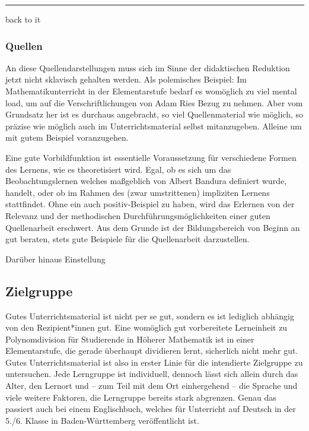 \vspace{12pt}
\hrule
\vspace{12pt}

back to it


\subsubsection{Quellen}

An diese Quellendarstellungen muss sich im Sinne der didaktischen Reduktion jetzt nicht sklavisch gehalten werden.
Als polemisches Beispiel: Im Mathematikunterricht in der Elementarstufe bedarf es womöglich zu viel mental load, um auf die Verschriftlichungen von Adam Ries Bezug zu nehmen. Aber vom Grundsatz her ist es durchaus angebracht, so viel Quellenmaterial wie möglich, so präzise wie möglich auch im Unterrichtsmaterial selbst mitanzugeben. Alleine um mit gutem Beispiel voranzugehen. 


Eine gute Vorbildfunktion ist essentielle Voraussetzung für verschiedene Formen des Lernens, wie es theoretisiert wird.
Egal, ob es sich um das Beobachtungslernen \autocite[73ff.]{Kiesel2012} welches maßgeblich von Albert Bandura definiert wurde, handelt, oder ob im Rahmen des (zwar umstrittenen) impliziten Lernens \autocite[83ff.]{Kiesel2012} stattfindet. Ohne ein auch positiv-Beispiel zu haben, wird das Erlernen von der Relevanz und der methodischen Durchführungsmöglichkeiten einer guten Quellenarbeit erschwert. Aus dem Grunde ist der Bildungsbereich von Beginn an gut beraten, stets gute Beispiele für die Quellenarbeit darzustellen. 


Darüber hinaus Einstellung \autocite[130]{Kiesel2012}



\subsection{Zielgruppe}
Gutes Unterrichtsmaterial ist nicht per se gut, sondern es ist lediglich abhängig von den Rezipient*innen gut. Eine womöglich gut vorbereitete Lerneinheit zu Polynomdivision für Studierende in Höherer Mathematik ist in einer Elementarstufe, die gerade überhaupt dividieren lernt, sicherlich nicht mehr gut. Gutes Unterrichtsmaterial ist also in erster Linie für die intendierte Zielgruppe zu untersuchen. Jede Lerngruppe ist individuell, dennoch lässt sich allein durch das Alter, den Lernort und -- zum Teil  mit dem Ort einhergehend -- die Sprache und viele weitere Faktoren, die Lerngruppe bereits stark abgrenzen. Genau das passiert auch bei einem Englischbuch, welches für Unterricht auf Deutsch in der 5./6. Klasse in Baden-Württemberg veröffentlicht ist. 

